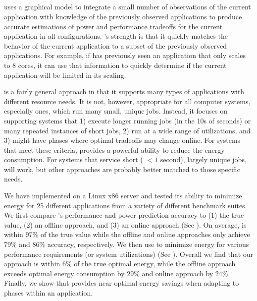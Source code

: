 \subsection{\SYSTEMLEO{}}
\SYSTEMLEO{} uses a graphical model to integrate a small number of
observations of the current application with knowledge of the
previously observed applications to produce accurate estimations of
power and performance tradeoffs for the current application in all
configurations.  \SYSTEMLEO{}'s strength is that it quickly matches the
behavior of the current application to a subset of the previously
observed applications.  For example, if \SYSTEMLEO{} has previously seen
an application that only scales to 8 cores, it can use that
information to quickly determine if the current application will be
limited in its scaling.


\SYSTEMLEO{} is a fairly general approach in that it supports many types
of applications with different resource needs.  It is not, however,
appropriate for all computer systems, especially ones, which run many
small, unique jobs.  Instead, it focuses on supporting systems that 1)
execute longer running jobs (in the 10s of seconds) or many repeated
instances of short jobs, 2) run at a wide range of utilizations, and
3) might have phases where optimal tradeoffs may change online.  For
systems that meet these criteria, \SYSTEMLEO{} provides a powerful
ability to reduce the energy consumption.  For systems that service
short ( $< 1$ second), largely unique jobs, \SYSTEMLEO{} will work, but
other approaches are probably better matched to those specific needs.

We have implemented \SYSTEMLEO{} on a Linux x86 server and tested its
ability to minimize energy for 25 different applications from a
variety of different benchmark suites.  We first compare \SYSTEMLEO{}'s
performance and power prediction accuracy to (1) the true value, (2)
an offline approach, and (3) an online approach (See
).  On average, \SYSTEMLEO{} is within 97\% of the true
value while the offline and online approaches only achieve 79\% and
86\% accuracy, respectively.  We then use \SYSTEMLEO{} to minimize energy
for various performance requirements (or system utilizations) (See
).  Overall we find that our approach is
within 6\% of the true optimal energy, while the offline approach
exceeds optimal energy consumption by 29\% and online approach by
24\%.  Finally, we show that \SYSTEMLEO{} provides near optimal energy
savings when adapting to phases within an application.

